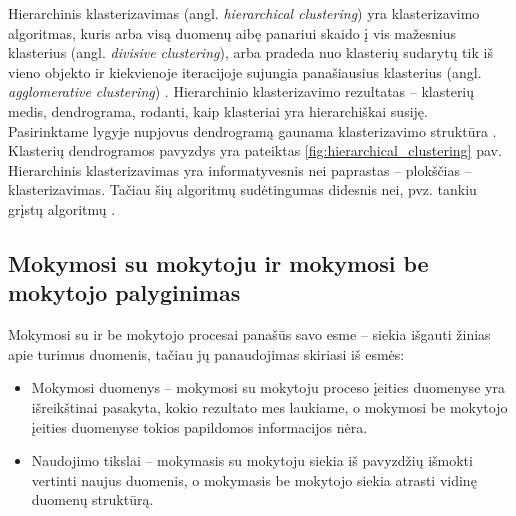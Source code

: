 Hierarchinis klasterizavimas (angl. \textit{hierarchical clustering}) yra klasterizavimo algoritmas, kuris arba visą duomenų aibę panariui skaido į vis mažesnius klasterius (angl. \textit{divisive clustering}), arba pradeda nuo klasterių sudarytų tik iš vieno objekto ir kiekvienoje iteracijoje sujungia panašiausius klasterius (angl. \textit{agglomerative clustering}) \cite{DBLP:books/mk/HanK2000}.  Hierarchinio klasterizavimo rezultatas -- klasterių medis, dendrograma, rodanti, kaip klasteriai yra hierarchiškai susiję. Pasirinktame lygyje nupjovus dendrogramą gaunama klasterizavimo struktūra \cite{martisiute08}. Klasterių dendrogramos pavyzdys yra pateiktas \ref{fig:hierarchical_clustering} pav. Hierarchinis klasterizavimas yra informatyvesnis nei paprastas -- plokščias -- klasterizavimas. Tačiau šių algoritmų sudėtingumas didesnis nei, pvz. tankiu grįstų algoritmų \cite{DBLP:books/mk/HanK2000}.

\subsection{Mokymosi su mokytoju ir mokymosi be mokytojo palyginimas}

 Mokymosi su ir be mokytojo procesai panašūs savo esme -- siekia išgauti žinias apie turimus duomenis, tačiau jų panaudojimas skiriasi iš esmės:
\begin{itemize}
  \item Mokymosi duomenys -- mokymosi su mokytoju proceso įeities duomenyse yra išreikštinai pasakyta, kokio rezultato mes laukiame, o mokymosi be mokytojo įeities duomenyse tokios papildomos informacijos nėra.
  \item  Naudojimo tikslai -- mokymasis su mokytoju siekia iš pavyzdžių išmokti vertinti naujus duomenis, o mokymasis be mokytojo siekia atrasti vidinę duomenų struktūrą.
\end{itemize}



